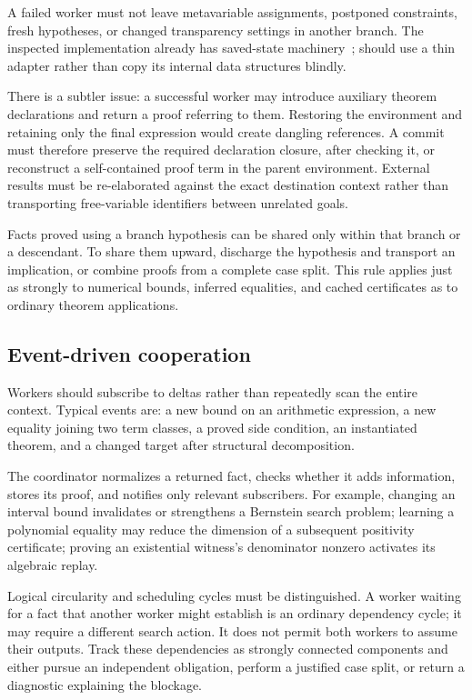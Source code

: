 A failed worker must not leave metavariable assignments, postponed constraints, fresh hypotheses, or changed transparency settings in another branch. The inspected \grind{} implementation already has saved-state machinery~\cite{grindtypes}; \forge{} should use a thin adapter rather than copy its internal data structures blindly.

There is a subtler issue: a successful worker may introduce auxiliary theorem declarations and return a proof referring to them. Restoring the environment and retaining only the final expression would create dangling references. A commit must therefore preserve the required declaration closure, after checking it, or reconstruct a self-contained proof term in the parent environment. External results must be re-elaborated against the exact destination context rather than transporting free-variable identifiers between unrelated goals.

Facts proved using a branch hypothesis can be shared only within that branch or a descendant. To share them upward, discharge the hypothesis and transport an implication, or combine proofs from a complete case split. This rule applies just as strongly to numerical bounds, inferred equalities, and cached certificates as to ordinary theorem applications.

\subsection{Event-driven cooperation}

Workers should subscribe to deltas rather than repeatedly scan the entire context. Typical events are: a new bound on an arithmetic expression, a new equality joining two term classes, a proved side condition, an instantiated theorem, and a changed target after structural decomposition.

The coordinator normalizes a returned fact, checks whether it adds information, stores its proof, and notifies only relevant subscribers. For example, changing an interval bound invalidates or strengthens a Bernstein search problem; learning a polynomial equality may reduce the dimension of a subsequent positivity certificate; proving an existential witness's denominator nonzero activates its algebraic replay.

Logical circularity and scheduling cycles must be distinguished. A worker waiting for a fact that another worker might establish is an ordinary dependency cycle; it may require a different search action. It does not permit both workers to assume their outputs. Track these dependencies as strongly connected components and either pursue an independent obligation, perform a justified case split, or return a diagnostic explaining the blockage.

